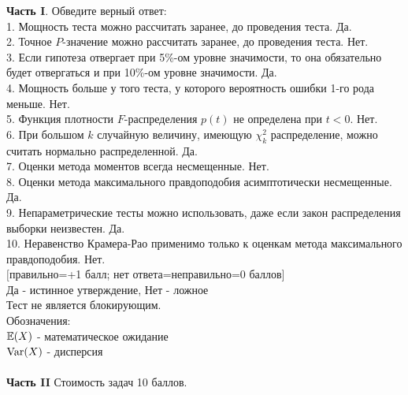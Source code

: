 \documentclass[12pt, a4paper]{article}\usepackage[]{graphicx}\usepackage[]{color}
\begin{document}
	\textbf{Часть I}. Обведите верный ответ: \\

	1. Мощность теста можно рассчитать заранее, до проведения теста. Да.  \\

	2. Точное $P$-значение можно рассчитать заранее, до проведения теста. Нет. \\

	3. Если гипотеза отвергает при 5\%-ом уровне значимости, то
	она обязательно будет отвергаться и при 10\%-ом уровне значимости. Да. \\

	4. Мощность больше у того теста, у которого вероятность ошибки
	1-го рода меньше.  Нет. \\

	5. Функция плотности $F$-распределения $p(t)$ не определена при $t<0$.  Нет. \\

	6. При большом $k$ случайную величину, имеющую $\chi_{k}^{2}$ распределение, можно считать нормально распределенной. Да.  \\

	7. Оценки метода моментов всегда несмещенные.  Нет. \\

	8. Оценки метода максимального правдоподобия асимптотически несмещенные. Да.  \\

	9. Непараметрические тесты можно использовать, даже если закон распределения выборки неизвестен. Да.  \\

	10. Неравенство Крамера-Рао применимо только к оценкам метода максимального правдоподобия. Нет. \\



	$[$правильно=+1 балл; нет ответа=неправильно=0 баллов$]$ \\
	Да - истинное утверждение, Нет - ложное \\
	Тест не является блокирующим. \\
	Обозначения: \\
	$\mathbb{E}(X)$ - математическое ожидание \\
	$\operatorname{Var}(X)$ - дисперсия \\ \\

	\textbf{Часть II} Стоимость задач 10 баллов. \\
\end{document}
